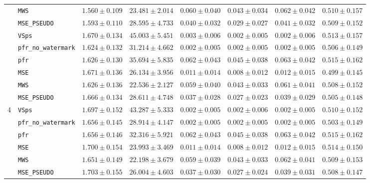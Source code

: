 \documentclass{article}
\theoremstyle{plain}
\theoremstyle{definition}
\begin{document}
\begin{table}[!htbp]
{\begin{tabular}{llcccccc}
 & \texttt{MWS} & $1.560 \pm 0.109$ & $23.481 \pm 2.014$ & $0.060 \pm 0.040$ & $0.043 \pm 0.034$ & $0.062 \pm 0.042$ & $0.510 \pm 0.157$ \\
 & \texttt{MSE\_PSEUDO} & $1.593 \pm 0.110$ & $28.595 \pm 4.733$ & $0.040 \pm 0.032$ & $0.029 \pm 0.027$ & $0.041 \pm 0.032$ & $0.509 \pm 0.152$ \\
\m& \texttt{VSps} & $1.670 \pm 0.134$ & $45.003 \pm 5.451$ & $0.003 \pm 0.006$ & $0.002 \pm 0.005$ & $0.002 \pm 0.006$ & $0.513 \pm 0.157$ \\
 & \texttt{pfr\_no\_watermark} & $1.624 \pm 0.132$ & $31.214 \pm 4.662$ & $0.002 \pm 0.005$ & $0.002 \pm 0.005$ & $0.002 \pm 0.005$ & $0.506 \pm 0.149$ \\
 & \texttt{pfr} & $1.626 \pm 0.130$ & $35.694 \pm 5.835$ & $0.062 \pm 0.043$ & $0.045 \pm 0.038$ & $0.063 \pm 0.042$ & $0.515 \pm 0.162$ \\
 & \texttt{MSE} & $1.671 \pm 0.136$ & $26.134 \pm 3.956$ & $0.011 \pm 0.014$ & $0.008 \pm 0.012$ & $0.012 \pm 0.015$ & $0.499 \pm 0.145$ \\
 & \texttt{MWS} & $1.626 \pm 0.136$ & $22.536 \pm 2.127$ & $0.059 \pm 0.040$ & $0.043 \pm 0.033$ & $0.061 \pm 0.041$ & $0.508 \pm 0.152$ \\
 & \texttt{MSE\_PSEUDO} & $1.666 \pm 0.134$ & $28.611 \pm 4.748$ & $0.037 \pm 0.028$ & $0.027 \pm 0.023$ & $0.039 \pm 0.029$ & $0.505 \pm 0.148$ \\
\midrule
4  & \texttt{VSps} & $1.697 \pm 0.152$ & $43.287 \pm 5.333$ & $0.002 \pm 0.005$ & $0.002 \pm 0.006$ & $0.002 \pm 0.005$ & $0.510 \pm 0.152$ \\
 & \texttt{pfr\_no\_watermark} & $1.656 \pm 0.145$ & $28.914 \pm 4.147$ & $0.002 \pm 0.005$ & $0.002 \pm 0.005$ & $0.002 \pm 0.005$ & $0.503 \pm 0.149$ \\
 & \texttt{pfr} & $1.656 \pm 0.146$ & $32.316 \pm 5.921$ & $0.062 \pm 0.043$ & $0.045 \pm 0.038$ & $0.063 \pm 0.042$ & $0.515 \pm 0.162$ \\
 & \texttt{MSE} & $1.700 \pm 0.154$ & $23.993 \pm 3.469$ & $0.011 \pm 0.014$ & $0.008 \pm 0.012$ & $0.012 \pm 0.015$ & $0.514 \pm 0.150$ \\
 & \texttt{MWS} & $1.651 \pm 0.149$ & $22.198 \pm 3.679$ & $0.059 \pm 0.039$ & $0.043 \pm 0.033$ & $0.062 \pm 0.041$ & $0.509 \pm 0.153$ \\
 & \texttt{MSE\_PSEUDO} & $1.703 \pm 0.155$ & $26.004 \pm 4.603$ & $0.037 \pm 0.030$ & $0.027 \pm 0.024$ & $0.039 \pm 0.031$ & $0.508 \pm 0.147$ \\
\bottomrule
\end{tabular}
}
\end{table}
\end{document}
